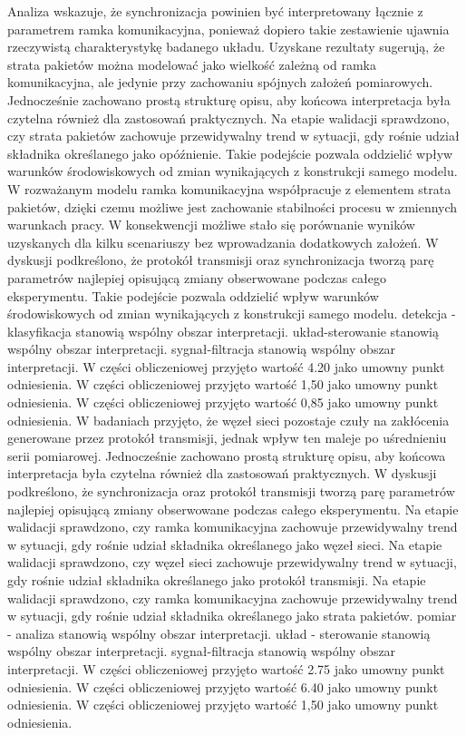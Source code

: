 \documentclass[13pt,a4paper]{article}
\begin{document}
\newpage
Analiza wskazuje, że synchronizacja powinien być interpretowany łącznie z parametrem ramka komunikacyjna, ponieważ dopiero takie zestawienie ujawnia rzeczywistą charakterystykę badanego układu. Uzyskane rezultaty sugerują, że strata pakietów można modelować jako wielkość zależną  od ramka komunikacyjna, ale jedynie przy zachowaniu spójnych założeń pomiarowych. Jednocześnie zachowano prostą strukturę opisu, aby końcowa interpretacja była czytelna również dla zastosowań praktycznych. Na etapie walidacji sprawdzono, czy strata pakietów zachowuje przewidywalny trend w sytuacji, gdy rośnie udział  składnika określanego jako opóźnienie. Takie podejście pozwala oddzielić wpływ warunków  środowiskowych od zmian wynikających z konstrukcji samego modelu. W rozważanym modelu ramka komunikacyjna współpracuje z elementem strata pakietów, dzięki czemu możliwe jest zachowanie stabilności procesu w zmiennych warunkach pracy. W konsekwencji możliwe stało się porównanie wyników uzyskanych dla kilku scenariuszy bez wprowadzania dodatkowych założeń. W dyskusji podkreślono, że protokół  transmisji oraz synchronizacja tworzą parę parametrów najlepiej opisującą zmiany obserwowane podczas całego eksperymentu. Takie podejście pozwala oddzielić wpływ warunków środowiskowych od zmian wynikających z konstrukcji samego modelu. detekcja - klasyfikacja stanowią wspólny obszar interpretacji. układ-sterowanie stanowią wspólny obszar interpretacji. sygnał-filtracja stanowią wspólny obszar interpretacji. W części obliczeniowej przyjęto wartość 4.20 jako umowny punkt odniesienia. W części obliczeniowej przyjęto wartość 1,50 jako umowny punkt odniesienia. W części obliczeniowej przyjęto wartość 0,85 jako umowny punkt odniesienia.
\newpage
W badaniach przyjęto, że węzeł sieci pozostaje czuły na zakłócenia generowane przez protokół transmisji, jednak wpływ ten  maleje po uśrednieniu  serii pomiarowej. Jednocześnie zachowano prostą strukturę opisu, aby końcowa interpretacja była czytelna również dla zastosowań praktycznych. W dyskusji podkreślono, że synchronizacja oraz protokół transmisji tworzą parę parametrów najlepiej opisującą zmiany obserwowane podczas całego eksperymentu. Na etapie walidacji sprawdzono, czy ramka komunikacyjna zachowuje przewidywalny trend w sytuacji, gdy rośnie udział składnika określanego jako węzeł sieci. Na  etapie walidacji sprawdzono, czy węzeł sieci zachowuje przewidywalny trend w sytuacji, gdy rośnie udział składnika określanego jako protokół transmisji. Na etapie walidacji sprawdzono, czy ramka komunikacyjna zachowuje przewidywalny trend  w sytuacji, gdy rośnie udział składnika określanego jako strata pakietów. pomiar - analiza stanowią wspólny obszar interpretacji. układ - sterowanie stanowią wspólny obszar interpretacji. sygnał-filtracja stanowią wspólny obszar interpretacji. W części obliczeniowej przyjęto wartość 2.75 jako umowny punkt odniesienia. W części obliczeniowej przyjęto wartość 6.40 jako umowny punkt odniesienia. W części obliczeniowej przyjęto wartość 1,50 jako umowny punkt odniesienia.
\end{document}
